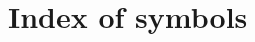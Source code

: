 \chapter*{Index of symbols}

\newcommand{\pg}[1]{p.~\pageref{#1}}
\newcommand{\symbolindex}[2]{\hbox{\makebox[0.2\textwidth][s]{#1\hfill}\hspace*{2.5em}\parbox[t]{0.65\textwidth}{#2\hfill}}\\[1.5pt]}



